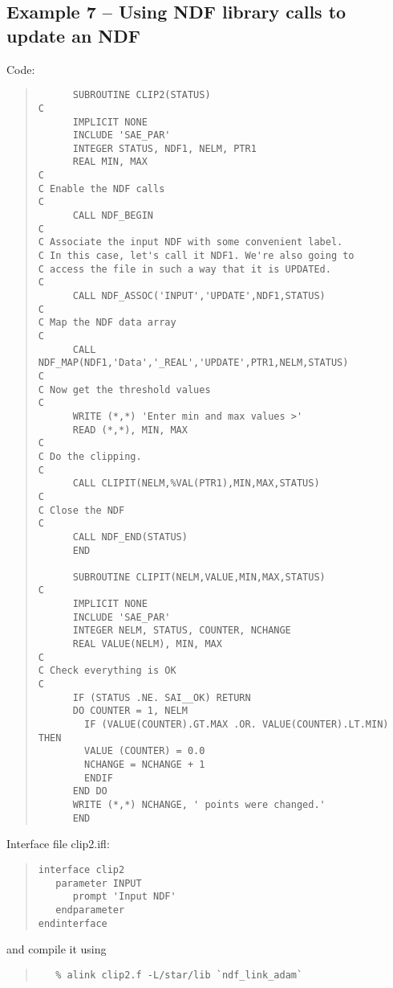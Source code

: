 \subsection{Example 7 -- Using NDF library calls to update an NDF}

Code:

\begin{quote}
{\small
\begin{verbatim}
      SUBROUTINE CLIP2(STATUS)
C
      IMPLICIT NONE
      INCLUDE 'SAE_PAR'
      INTEGER STATUS, NDF1, NELM, PTR1
      REAL MIN, MAX
C
C Enable the NDF calls
C
      CALL NDF_BEGIN
C
C Associate the input NDF with some convenient label.
C In this case, let's call it NDF1. We're also going to
C access the file in such a way that it is UPDATEd.
C
      CALL NDF_ASSOC('INPUT','UPDATE',NDF1,STATUS)
C
C Map the NDF data array
C
      CALL NDF_MAP(NDF1,'Data','_REAL','UPDATE',PTR1,NELM,STATUS)
C
C Now get the threshold values
C
      WRITE (*,*) 'Enter min and max values >'
      READ (*,*), MIN, MAX
C
C Do the clipping.
C
      CALL CLIPIT(NELM,%VAL(PTR1),MIN,MAX,STATUS)
C
C Close the NDF
C
      CALL NDF_END(STATUS)
      END

      SUBROUTINE CLIPIT(NELM,VALUE,MIN,MAX,STATUS)
C
      IMPLICIT NONE
      INCLUDE 'SAE_PAR'
      INTEGER NELM, STATUS, COUNTER, NCHANGE
      REAL VALUE(NELM), MIN, MAX
C
C Check everything is OK
C
      IF (STATUS .NE. SAI__OK) RETURN
      DO COUNTER = 1, NELM
        IF (VALUE(COUNTER).GT.MAX .OR. VALUE(COUNTER).LT.MIN) THEN
        VALUE (COUNTER) = 0.0
        NCHANGE = NCHANGE + 1
        ENDIF
      END DO
      WRITE (*,*) NCHANGE, ' points were changed.'
      END
\end{verbatim}
}
\end{quote}

Interface file {\sf clip2.ifl}:

\begin{quote}
{\small
\begin{verbatim}
interface clip2
   parameter INPUT
      prompt 'Input NDF'
   endparameter
endinterface
\end{verbatim}
}
\end{quote}

and compile it using

\begin{quote}
{\small
\begin{verbatim}
   % alink clip2.f -L/star/lib `ndf_link_adam`
\end{verbatim}
}
\end{quote}

